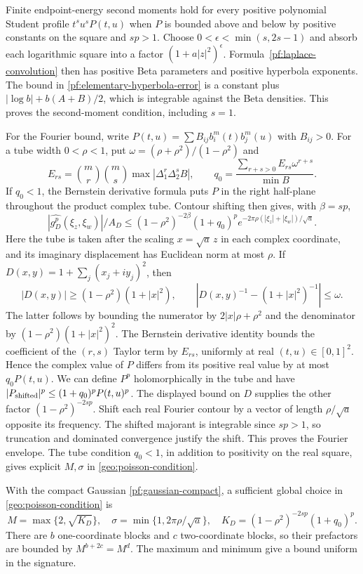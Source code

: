 Finite endpoint-energy second moments hold for every positive polynomial
Student profile $t^su^sP(t,u)$ when $P$ is bounded above and below by
positive constants on the square and $sp>1$. Choose
$0<\epsilon<\min(s,2s-1)$ and absorb each logarithmic square into a
factor $(1+a|z|^2)^\epsilon$. Formula~\eqref{pf:laplace-convolution}
then has positive Beta parameters and positive hyperbola exponents.
The bound in \eqref{pf:elementary-hyperbola-error} is a constant plus
$|\log b|+b(A+B)/2$, which is integrable against the Beta densities.
This proves the second-moment condition, including $s=1$.

For the Fourier bound, write
$P(t,u)=\sum B_{ij}b_i^m(t)b_j^m(u)$ with $B_{ij}>0$. For a tube width
$0<\rho<1$, put $\omega=(\rho+\rho^2)/(1-\rho^2)$ and
\[
 E_{rs}=\binom mr\binom ms\max|\Delta_1^r\Delta_2^sB|,
 \qquad q_0=\frac{\sum_{r+s>0}E_{rs}\omega^{r+s}}{\min B}.
\]
If $q_0<1$, the Bernstein derivative formula puts $P$ in the right
half-plane throughout the product complex tube. Contour shifting then
gives, with $\beta=sp$,
\[
 |\widehat {g_D^p}(\xi_z,\xi_w)|/A_D
 \le (1-\rho^2)^{-2\beta}(1+q_0)^p
 e^{-2\pi\rho(|\xi_z|+|\xi_w|)/\sqrt a}.
\]
Here the tube is taken after the scaling $x=\sqrt a\,z$ in each
complex coordinate, and its imaginary displacement has Euclidean norm at
most $\rho$. If $D(x,y)=1+\sum_j(x_j+iy_j)^2$, then
\[
 |D(x,y)|\ge (1-\rho^2)(1+|x|^2),\qquad
 \left|D(x,y)^{-1}-(1+|x|^2)^{-1}\right|\le\omega.
\]
The latter follows by bounding the numerator by $2|x|\rho+\rho^2$
and the denominator by $(1-\rho^2)(1+|x|^2)^2$.
The Bernstein derivative identity bounds the coefficient of the
$(r,s)$ Taylor term by $E_{rs}$, uniformly at real $(t,u)\in[0,1]^2$.
Hence the complex value of $P$ differs from its positive real value by
at most $q_0P(t,u)$. We can define $P^p$ holomorphically in the tube and have
$|P_{\rm shifted}|^p\le(1+q_0)^pP(t,u)^p$. The displayed bound on $D$
supplies the other factor $(1-\rho^2)^{-2sp}$. Shift each real
Fourier contour by a vector of length $\rho/\sqrt a$ opposite its
frequency. The shifted majorant is integrable since $sp>1$, so
truncation and dominated convergence justify the shift. This proves the
Fourier envelope. The tube condition $q_0<1$, in addition to positivity
on the real square, gives explicit $M,\sigma$ in
\eqref{geo:poisson-condition}.

With the compact Gaussian \eqref{pf:gaussian-compact}, a sufficient
global choice in \eqref{geo:poisson-condition} is
\begin{equation}\label{pf:polynomial-fourier-contract}
 M=\max\{2,\sqrt{K_D}\},\quad
 \sigma=\min\{1,2\pi\rho/\sqrt a\},\quad
 K_D=(1-\rho^2)^{-2sp}(1+q_0)^p.
\end{equation}
There are $b$ one-coordinate blocks and $c$ two-coordinate blocks, so their
prefactors are bounded by $M^{b+2c}=M^d$. The maximum and minimum give
a bound uniform in the signature.

